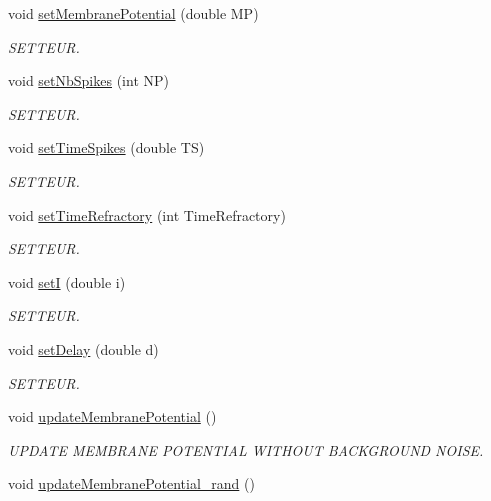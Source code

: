 \begin{DoxyCompactItemize}
void \hyperlink{classNeuron_acc5c70e280d6dac451a5c90934ab6ade}{set\-Membrane\-Potential} (double M\-P)
\begin{DoxyCompactList}\small\item\em S\-E\-T\-T\-E\-U\-R. \end{DoxyCompactList}\item 
void \hyperlink{classNeuron_acd20415b7ad38f76ba2484febb1c1fb6}{set\-Nb\-Spikes} (int N\-P)
\begin{DoxyCompactList}\small\item\em S\-E\-T\-T\-E\-U\-R. \end{DoxyCompactList}\item 
void \hyperlink{classNeuron_aad5ce50e5ce218ce48933979fd18981e}{set\-Time\-Spikes} (double T\-S)
\begin{DoxyCompactList}\small\item\em S\-E\-T\-T\-E\-U\-R. \end{DoxyCompactList}\item 
void \hyperlink{classNeuron_a146b0937c7bdfb599dac276150b42fbe}{set\-Time\-Refractory} (int Time\-Refractory)
\begin{DoxyCompactList}\small\item\em S\-E\-T\-T\-E\-U\-R. \end{DoxyCompactList}\item 
void \hyperlink{classNeuron_a1f78f39218708439988bdef25cf3d956}{set\-I} (double i)
\begin{DoxyCompactList}\small\item\em S\-E\-T\-T\-E\-U\-R. \end{DoxyCompactList}\item 
void \hyperlink{classNeuron_a5d32cc9f1adc9f5d2dca19496ce7bde1}{set\-Delay} (double d)
\begin{DoxyCompactList}\small\item\em S\-E\-T\-T\-E\-U\-R. \end{DoxyCompactList}\item 
void \hyperlink{classNeuron_a41a81d8527734e59bae39f73fece887f}{update\-Membrane\-Potential} ()
\begin{DoxyCompactList}\small\item\em U\-P\-D\-A\-T\-E M\-E\-M\-B\-R\-A\-N\-E P\-O\-T\-E\-N\-T\-I\-A\-L W\-I\-T\-H\-O\-U\-T B\-A\-C\-K\-G\-R\-O\-U\-N\-D N\-O\-I\-S\-E. \end{DoxyCompactList}\item 
void \hyperlink{classNeuron_a31ff80c9067c1064745cbd2c275fe432}{update\-Membrane\-Potential\-\_\-rand} ()

\end{DoxyCompactItemize}
